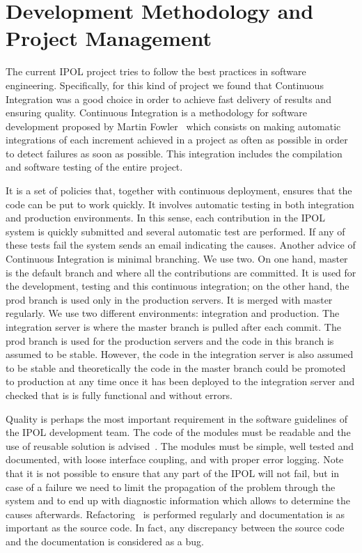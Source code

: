 
\section{Development Methodology and Project Management}
The current IPOL project tries to follow the best practices in software engineering. Specifically, for this kind of project we found that Continuous Integration was a good choice in order to achieve fast delivery of results and ensuring quality. Continuous Integration is a methodology for software development proposed by Martin Fowler~\cite{fowler2006continuous} which consists on making automatic integrations of each increment achieved in a project as often as possible in order to detect failures as soon as possible. This integration includes the compilation and software testing of the entire project.

It is a set of policies that, together with continuous deployment, ensures that the code can be put to work quickly. It involves automatic testing in both integration and production environments. In this sense, each contribution in the IPOL system is quickly submitted and several automatic test are performed. If any of these tests fail the system sends an email indicating the causes.
%
Another advice of Continuous Integration is minimal branching. We use two. On one hand, master is the default branch and where all the contributions are committed. It is used for the development, testing and this continuous integration; on the other hand, the prod branch is used only in the production servers. It is merged with master regularly.
%
We use two different environments: integration and production. The integration server is where the master branch is pulled after each commit. The prod branch is used for the production servers and the code in this branch is assumed to be stable. However, the code in the integration server is also assumed to be stable and theoretically the code in the master branch could be promoted to production at any time once it has been deployed to the integration server and checked that is is fully functional and without errors. 

Quality is perhaps the most important requirement in the software guidelines of the IPOL development team. The code of the modules must be readable and the use of reusable solution is advised~\cite{GoF}. The modules must be simple, well tested and documented, with loose interface coupling, and with proper error logging. Note that it is not possible to ensure that any part of the IPOL will not fail, but in case of a failure we need to limit the propagation of the problem through the system and to end up with diagnostic information which allows to determine the causes afterwards.
%
Refactoring~\cite{fowler1999refactoring} is performed regularly and documentation is as important as the source code. In fact, any discrepancy between the source code and the documentation is considered as a bug.

